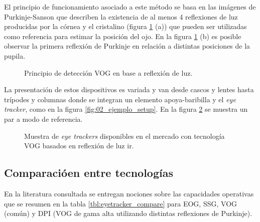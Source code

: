 \documentclass[../main.tex]{subfiles}
\begin{document}
\begin{enumerate}
				El principio de funcionamiento asociado a este método se basa en las imágenes de Purkinje-Sanson que describen la existencia de al menos 4 reflexiones de luz producidas por la córnea y el cristalino (figura \ref{fig:02_et_vog1} (a)) que pueden ser utilizadas como referencia para estimar la posición del ojo. En la figura \ref{fig:02_et_vog1} (b) es posible observar la primera reflexión de Purkinje en relación a distintas posiciones de la pupila.
				\begin{figure}[H]
					\centering
					\hspace{5mm}
					\caption[Principio de detección VOG en base a reflexión de luz]{Principio de detección VOG en base a reflexión de luz\cite{dissertation:eyetrackers}.}
					\label{fig:02_et_vog1}
				\end{figure}

				La presentación de estos dispositivos es variada y van desde cascos y lentes hasta trípodes y columnas donde se integran un elemento apoya-baribilla y el \textit{eye tracker}, como en la figura \ref{fig:02_ejemplo_setup}. En la figura \ref{fig:02_et_vog2} se muestra un par a modo de referencia. 
				\begin{figure}[H]
					\centering
					\hspace{5mm}
					\caption[Muestra de \textit{eye trackers} disponibles en el mercado con tecnología VOG basados en reflexión de luz \acrshort{ir}]{Muestra de \textit{eye trackers} disponibles en el mercado con tecnología VOG basados en reflexión de luz \acrshort{ir}\footnotemark.}
					\label{fig:02_et_vog2}
				\end{figure}

			\end{enumerate}

		\subsection{Comparacióen entre tecnologías}
		\label{sub:02_comparativa_eyetracker}
			En la literatura consultada \cite{dissertation:eyetrackers, article:eyetracker_eggert, article:eyetracker_richardson} se entregan nociones sobre las capacidades operativas que se resumen en la tabla \ref{tbl:eyetracker_compare} para EOG, SSG, VOG (común) y DPI (VOG de gama alta utilizando distintas reflexiones de Purkinje). 
\end{document}
